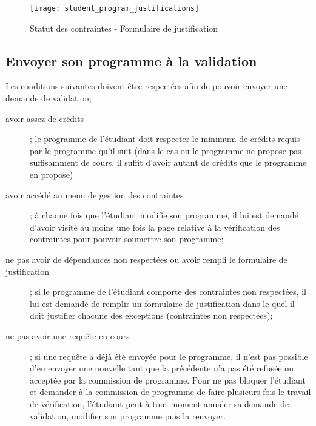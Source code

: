 \begin{figure}[htb]
\centering
\caption{Statut des contraintes - Formulaire de justification}
\label{fig:student_program_justifications}
\texttt{[image: student\_program\_justifications]}
\end{figure}

\subsection{Envoyer son programme à la validation}

Les conditions suivantes doivent être respectées afin de pouvoir envoyer une demande de validation;
\begin{description}
  \item[avoir assez de crédits] ; le programme de l'étudiant doit respecter le minimum de crédits requis par le programme qu'il suit (dans le cas ou le programme ne propose pas suffisamment de cours, il suffit d'avoir autant de crédits que le programme en propose)
  \item[avoir accédé au menu de gestion des contraintes] ; à chaque fois que l'étudiant modifie son programme, il lui est demandé d'avoir visité au moins une fois la page relative à la vérification des contraintes pour pouvoir soumettre son programme;
  \item[ne pas avoir de dépendances non respectées ou avoir rempli le formulaire de justification] ; si le programme de l'étudiant comporte des contraintes non respectées, il lui est demandé de remplir un formulaire de justification dans le quel il doit justifier chacune des exceptions (contraintes non respectées);
  \item[ne pas avoir une requête en cours] ; si une requête a déjà été envoyée pour le programme, il n'est pas possible d'en envoyer une nouvelle tant que la précédente n'a pas été refusée ou acceptée par la commission de programme. Pour ne pas bloquer l'étudiant et demander à la commission de programme de faire plusieurs fois le travail de vérification, l'étudiant peut à tout moment annuler sa demande de validation, modifier son programme puis la renvoyer. 
\end{description} 

